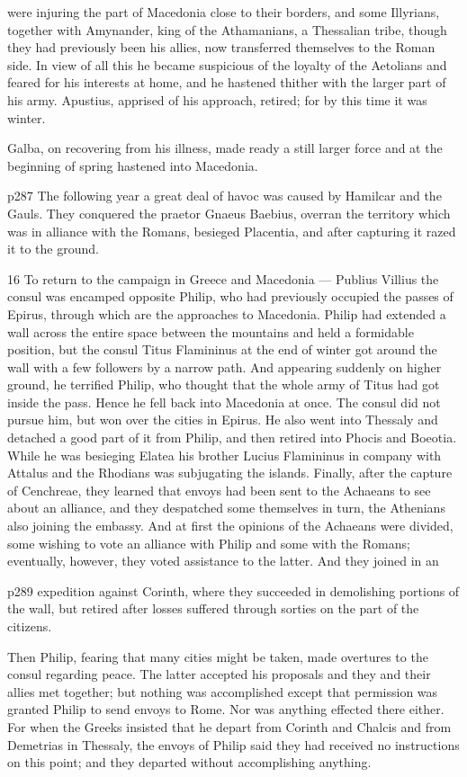 were injuring the part of Macedonia close to their borders, and some Illyrians, together with Amynander, king of the Athamanians, a Thessalian tribe, though they had previously been his allies, now transferred themselves to the Roman side. In view of all this he became suspicious of the loyalty of the Aetolians and feared for his interests at home, and he hastened thither with the larger part of his army. Apustius, apprised of his approach, retired; for by this time it was winter.

Galba, on recovering from his illness, made ready a still larger force and at the beginning of spring hastened into Macedonia.

p287
The following year a great deal of havoc was caused by Hamilcar and the Gauls. They conquered the praetor Gnaeus Baebius, overran the territory which was in alliance with the Romans, besieged Placentia, and after capturing it razed it to the ground.

16
To return to the campaign in Greece and Macedonia \texthebrew{—} Publius Villius the consul was encamped opposite Philip, who had previously occupied the passes of Epirus, through which are the approaches to Macedonia. Philip had extended a wall across the entire space between the mountains and held a formidable position, but the consul Titus Flamininus\texthebrew{⁠} at the end of winter got around the wall with a few followers by a narrow path. And appearing suddenly on higher ground, he terrified Philip, who thought that the whole army of Titus had got inside the pass. Hence he fell back into Macedonia at once. The consul did not pursue him, but won over the cities in Epirus. He also went into Thessaly and detached a good part of it from Philip, and then retired into Phocis and Boeotia. While he was besieging Elatea his brother Lucius Flamininus in company with Attalus and the Rhodians was subjugating the islands. Finally, after the capture of Cenchreae, they learned that envoys had been sent to the Achaeans to see about an alliance, and they despatched some themselves in turn, the Athenians also joining the embassy. And at first the opinions of the Achaeans were divided, some wishing to vote an alliance with Philip and some with the Romans; eventually, however, they voted assistance to the latter. And they joined in an

p289 expedition against Corinth, where they succeeded in demolishing portions of the wall, but retired after losses suffered through sorties on the part of the citizens.

Then Philip, fearing that many cities might be taken, made overtures to the consul regarding peace. The latter accepted his proposals and they and their allies met together; but nothing was accomplished except that permission was granted Philip to send envoys to Rome. Nor was anything effected there either. For when the Greeks insisted that he depart from Corinth and Chalcis and from Demetrias in Thessaly, the envoys of Philip said they had received no instructions on this point; and they departed without accomplishing anything.

